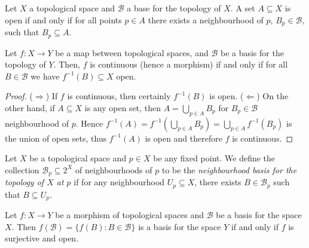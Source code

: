 \begin{proposition}
  Let \(X\) a topological space and \(\mathcal B\) a base for the topology of
  \(X\). A set \(A \subseteq X\) is open if and only if for all points \(p \in
  A\) there exists a neighbourhood of \(p\), \(B_p \in \mathcal B\), such that
  \(B_p \subseteq A\).
\end{proposition}

\begin{proposition}
  Let \(f: X \to Y\) be a map between topological spaces, and \(\mathcal B\) be
  a basis for the topology of \(Y\). Then, \(f\) is continuous (hence a
  morphism) if and only if for all \(B \in \mathcal B\) we have \(f^{-1}(B)
  \subseteq X\) open.
\end{proposition}

\begin{proof}
  (\(\Rightarrow\)) If \(f\) is continuous, then certainly \(f^{-1}(B)\) is
  open. (\(\Leftarrow\)) On the other hand, if \(A \subseteq X\) is any open
  set, then \(A = \bigcup_{p \in A} B_p\) for \(B_p \in \mathcal B\)
  neighbourhood of \(p\). Hence \(f^{-1}(A) = f^{-1} \left( \bigcup_{p \in A}
  B_p \right) = \bigcup_{p \in A} f^{-1}(B_p)\) is the union of open sets, thus
  \(f^{-1}(A)\) is open and therefore \(f\) is continuous.
\end{proof}

\begin{definition}\label{def: basis at a point}
  Let \(X\) be a topological space and \(p \in X\) be any fixed point. We define
  the collection \(\mathcal B_p \subseteq 2^X\) of neighbourhoods of \(p\) to be
  the \emph{neighbourhood basis for the topology of \(X\) at \(p\)} if for any
  neighbourhood \(U_p \subseteq X\), there exists \(B \in \mathcal B_p\) such
  that \(B \subseteq U_p\).
\end{definition}

\begin{proposition}\label{prop: basis image surjective}
  Let \(f: X \to Y\) be a morphism of topological spaces and \(\mathcal B\) be a
  basis for the space \(X\). Then \(f(\mathcal B) = \{f(B): B \in \mathcal B\}\)
  is a basis for the space \(Y\) if and only if \(f\) is surjective and open.
\end{proposition}

